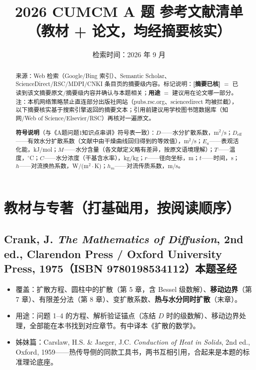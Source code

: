 \documentclass[12pt,a4paper]{ctexart}
\title{\bfseries 2026 CUMCM A 题 参考文献清单\\（教材 + 论文，均经摘要核实）}
\author{检索时间：2026 年 9 月}
\date{}
\begin{document}
\maketitle

\begin{abstract}
来源：Web 检索（Google/Bing 索引）、Semantic Scholar、ScienceDirect/RSC/MDPI/CNKI 条目页的摘要级内容。标记说明：\textbf{[摘要已核]} $=$ 已读到该文摘要原文/摘要级内容并确认与本题相关；\textbf{用途} $=$ 建议用在论文哪一部分。
注：本机网络策略禁止直连部分出版社网站（pubs.rsc.org、sciencedirect 均被拦截），以下摘要核实基于搜索引擎返回的摘要文本；引用前建议用学校图书馆数据库（知网/Web of Science/Elsevier/RSC）再核对一遍原文。

\textbf{符号说明}（与《A题问题1知识点串讲》符号表一致）：$D$——水分扩散系数，m$^2$/s；$D_{\mathrm{eff}}$——有效水分扩散系数（文献中由干燥曲线回归得到的等效值），m$^2$/s；$E_a$——表观活化能，kJ/mol；$M$——水分含量（各文献定义略有差异，按原文语境理解）；$T$——温度，$^\circ$C；$C$——水分浓度（干基含水率），kg/kg；$r$——径向坐标，m；$t$——时间，s；$h$——对流换热系数，W/(m$^2\cdot$K)；$h_m$——对流传质系数，m/s。
\end{abstract}

\tableofcontents
\newpage

\section{教材与专著（打基础用，按阅读顺序）}

\subsection{Crank, J. \textit{The Mathematics of Diffusion}, 2nd ed., Clarendon Press / Oxford University Press, 1975（ISBN 9780198534112）\quad 本题圣经}
\begin{itemize}
\item 覆盖：扩散方程、圆柱中的扩散（第 5 章，含 Bessel 级数解）、\textbf{移动边界}（第 7 章）、有限差分法（第 8 章）、变扩散系数、\textbf{热与水分同时扩散}（末章）。
\item 用途：问题 1--4 的方程、解析验证锚点（冻结 $D$ 时的级数解）、移动边界处理，全部能在本书找到对应章节。有中译本《扩散的数学》。
\item 姊妹篇：Carslaw, H.S. \& Jaeger, J.C. \textit{Conduction of Heat in Solids}, 2nd ed., Oxford, 1959——热传导侧的同款工具书，两书互相引用，合起来是本题的标准理论底座。
\end{itemize}
\end{document}
